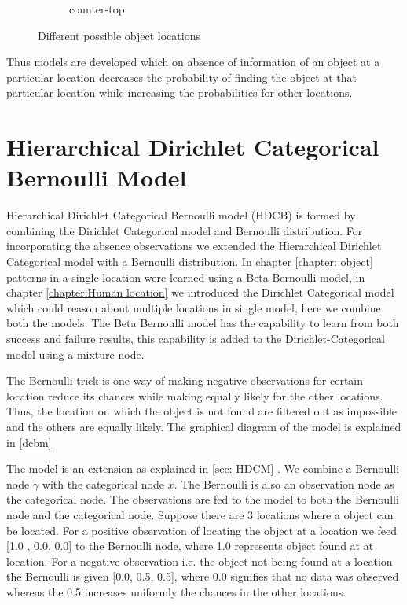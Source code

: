 \begin{figure}
\begin{subfigure}[b]{0.3\textwidth}
        \caption{counter-top}
        \label{fig:counter-top}
    \end{subfigure}
    \caption{Different possible object locations}\label{fig:alllocations}
\end{figure}


Thus models are developed which on absence of information of an object at a particular location decreases the probability of finding the object at that particular location while increasing the probabilities for other locations.


\FloatBarrier
\section{Hierarchical Dirichlet Categorical Bernoulli Model}

Hierarchical Dirichlet Categorical Bernoulli model (HDCB) is formed by combining the Dirichlet Categorical model and Bernoulli distribution.
For incorporating the absence observations we extended the Hierarchical Dirichlet Categorical model  with a Bernoulli distribution.
In chapter \ref{chapter: object} patterns in a single location were learned using a Beta Bernoulli model, in chapter \ref{chapter:Human location} we introduced the Dirichlet Categorical model which could reason about multiple locations in single model, here we combine both the models. The Beta Bernoulli model has the capability to learn from both success and failure results, this capability is added to the Dirichlet-Categorical model using a mixture node. 

The Bernoulli-trick is one way of making negative observations for certain location reduce its chances while making equally likely for the other locations. Thus, the location on which the object is not found are filtered out as impossible and the others are equally likely. The graphical diagram of the model is explained in \ref{dcbm}

The model is an extension as explained in \ref{sec: HDCM} . We combine a Bernoulli node $\gamma$ with the categorical node $x$. The Bernoulli is also an observation node as the categorical node. The observations are fed to the model to both the Bernoulli node and the categorical node. Suppose there are 3 locations where a object can be located. For a positive observation of locating the object at a location we feed [1.0 , 0.0, 0.0] to the Bernoulli node, where 1.0 represents object found at at location. For a negative observation i.e. the object not being found at a location the Bernoulli is given [0.0, 0.5, 0.5], where 0.0 signifies that no data was observed whereas the 0.5 increases uniformly the chances in the other locations.


